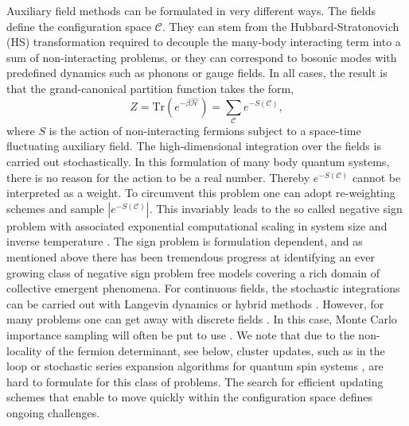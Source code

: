 \documentclass{SciPost}
\begin{document}
Auxiliary field methods  can be formulated in very different ways.  The fields define  the  configuration space $\mathcal{C}$. They can stem from the Hubbard-Stratonovich (HS)  \cite{Hubbard59} transformation required to decouple the  many-body interacting term into a sum of non-interacting problems,  or they can correspond to  bosonic modes with predefined dynamics such as phonons or gauge fields. In all cases, the result is that  the grand-canonical partition function  takes the form, 
\begin{equation}
	 Z = \text{Tr}\left( e^{-\beta \hat{\mathcal{H}}}\right)   =   \sum_{\mathcal{C}} e^{-S(\mathcal{C}) },
\end{equation}
where  $S$  is the action of non-interacting fermions subject to a  space-time fluctuating auxiliary field.    
The high-dimensional  integration  over the fields is carried out stochastically.  In this formulation of many  body quantum systems, there is no reason for the action to be a real number.  Thereby $e^{-S(\mathcal{C})}$ cannot be interpreted as a weight. To circumvent this problem one can adopt   re-weighting schemes and sample $| e^{-S(\mathcal{C})}| $. This invariably leads to the so called negative sign problem with associated exponential computational scaling in system size and inverse temperature \cite{Loh90, Troyer05}.    The  sign problem is formulation dependent, and as mentioned above there has been tremendous progress at identifying an ever growing class of  negative sign problem free models covering a  rich domain  of collective emergent  phenomena.  
 For continuous fields, the stochastic integrations can  be carried out with Langevin  dynamics or hybrid methods \cite{Duane85}.   However, for many  problems one can get away with discrete fields \cite{Hirsch83}. In this case,  Monte Carlo importance sampling will often be put to use \cite{Sokal89}.  
We note that  due to  the non-locality of the fermion determinant, see below, cluster updates,  such as in the loop or stochastic series expansion algorithms
 for quantum spin systems  \cite{Evertz93,Sandvik99b,Sandvik02}, are hard to formulate for this class of problems.  The search for efficient updating schemes that enable to move quickly within the configuration space defines ongoing challenges. 
\end{document}
